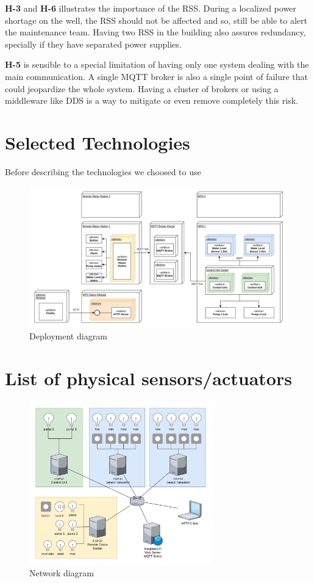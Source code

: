 \documentclass[11pt]{article}
\begin{document}
\textbf{H-3} and \textbf{H-6} illustrates the importance of the RSS. During a localized power shortage on the well, the RSS should not be affected and so, still be able to alert the maintenance team. Having two RSS in the building also assures redundancy, specially if they have separated power supplies.

\textbf{H-5} is sensible to a special limitation of having only one system dealing with the main communication. A single MQTT broker is also a single point of failure that could jeopardize the whole system. Having a cluster of brokers or using a middleware like DDS is a way to mitigate or even remove completely this risk.

\newpage
\section{Selected Technologies}

Before describing the technologies we choosed to use

\begin{figure}[H]
  \centering
  \includegraphics[width=\linewidth]{../diagrams/deployment-diagram-WPS.jpg}
  \caption{Deployment diagram}
  \label{fig:Deployment Diagram}
\end{figure}

\newpage
\section{List of physical sensors/actuators}

\begin{figure}[H]
  \centering
  \includegraphics[width=300px]{../diagrams/network-diagram-WPS.jpg}
  \caption{Network diagram}
  \label{fig:Network1 Diagram}
\end{figure}
\end{document}

